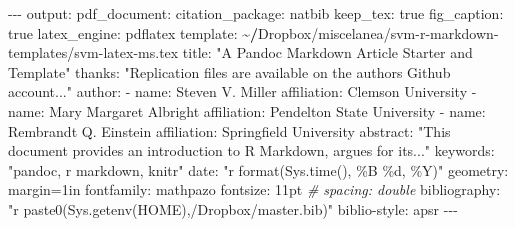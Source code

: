 \documentclass[11pt,]{article}
\newenvironment{Shaded}{\begin{snugshade}}{\end{snugshade}}
\newcommand{\CommentTok}[1]{\textcolor[rgb]{0.56,0.35,0.01}{\textit{#1}}}
\newcommand{\ErrorTok}[1]{\textcolor[rgb]{0.64,0.00,0.00}{\textbf{#1}}}
\newcommand{\NormalTok}[1]{#1}
\newcommand{\OtherTok}[1]{\textcolor[rgb]{0.56,0.35,0.01}{#1}}
\newcommand{\SpecialCharTok}[1]{\textcolor[rgb]{0.00,0.00,0.00}{#1}}
\newcommand{\StringTok}[1]{\textcolor[rgb]{0.31,0.60,0.02}{#1}}
\begin{document}
\begin{Shaded}
\begin{Highlighting}[]
\SpecialCharTok{{-}{-}{-}}
\NormalTok{output}\SpecialCharTok{:} 
\NormalTok{  pdf\_document}\SpecialCharTok{:}
\NormalTok{    citation\_package}\SpecialCharTok{:}\NormalTok{ natbib}
\NormalTok{    keep\_tex}\SpecialCharTok{:}\NormalTok{ true}
\NormalTok{    fig\_caption}\SpecialCharTok{:}\NormalTok{ true}
\NormalTok{    latex\_engine}\SpecialCharTok{:}\NormalTok{ pdflatex}
\NormalTok{    template}\SpecialCharTok{:} \ErrorTok{\textasciitilde{}/}\NormalTok{Dropbox}\SpecialCharTok{/}\NormalTok{miscelanea}\SpecialCharTok{/}\NormalTok{svm}\SpecialCharTok{{-}}\NormalTok{r}\SpecialCharTok{{-}}\NormalTok{markdown}\SpecialCharTok{{-}}\NormalTok{templates}\SpecialCharTok{/}\NormalTok{svm}\SpecialCharTok{{-}}\NormalTok{latex}\SpecialCharTok{{-}}\NormalTok{ms.tex}
\NormalTok{title}\SpecialCharTok{:} \StringTok{"A Pandoc Markdown Article Starter and Template"}
\NormalTok{thanks}\SpecialCharTok{:} \StringTok{"Replication files are available on the author\textquotesingle{}s Github account..."}
\NormalTok{author}\SpecialCharTok{:}
\SpecialCharTok{{-}}\NormalTok{ name}\SpecialCharTok{:}\NormalTok{ Steven V. Miller}
\NormalTok{  affiliation}\SpecialCharTok{:}\NormalTok{ Clemson University}
\SpecialCharTok{{-}}\NormalTok{ name}\SpecialCharTok{:}\NormalTok{ Mary Margaret Albright}
\NormalTok{  affiliation}\SpecialCharTok{:}\NormalTok{ Pendelton State University}
\SpecialCharTok{{-}}\NormalTok{ name}\SpecialCharTok{:}\NormalTok{ Rembrandt Q. Einstein}
\NormalTok{  affiliation}\SpecialCharTok{:}\NormalTok{ Springfield University}
\NormalTok{abstract}\SpecialCharTok{:} \StringTok{"This document provides an introduction to R Markdown, argues for its..."}
\NormalTok{keywords}\SpecialCharTok{:} \StringTok{"pandoc, r markdown, knitr"}
\NormalTok{date}\SpecialCharTok{:} \StringTok{"\textasciigrave{}r format(Sys.time(), \textquotesingle{}\%B \%d, \%Y\textquotesingle{})\textasciigrave{}"}
\NormalTok{geometry}\SpecialCharTok{:}\NormalTok{ margin}\OtherTok{=}\NormalTok{1in}
\NormalTok{fontfamily}\SpecialCharTok{:}\NormalTok{ mathpazo}
\NormalTok{fontsize}\SpecialCharTok{:}\NormalTok{ 11pt}
\CommentTok{\# spacing: double}
\NormalTok{bibliography}\SpecialCharTok{:} \StringTok{"\textasciigrave{}r paste0(Sys.getenv(\textquotesingle{}HOME\textquotesingle{}),\textquotesingle{}/Dropbox/master.bib\textquotesingle{})\textasciigrave{}"}
\NormalTok{biblio}\SpecialCharTok{{-}}\NormalTok{style}\SpecialCharTok{:}\NormalTok{ apsr}
\SpecialCharTok{{-}{-}{-}}
\end{Highlighting}
\end{Shaded}
\end{document}
